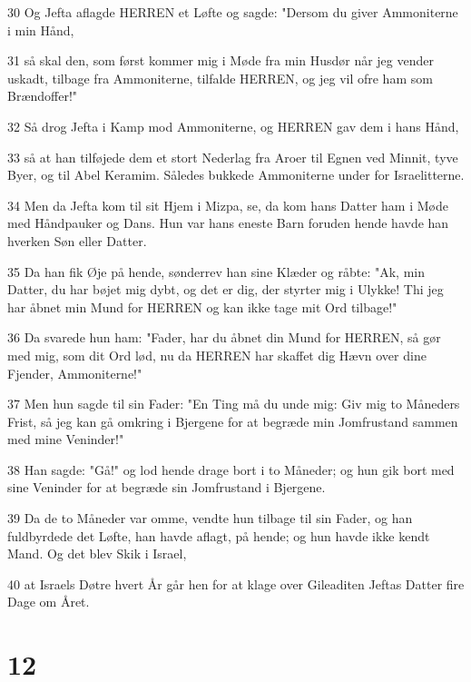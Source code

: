 \par 30 Og Jefta aflagde HERREN et Løfte og sagde: "Dersom du giver Ammoniterne i min Hånd,
\par 31 så skal den, som først kommer mig i Møde fra min Husdør når jeg vender uskadt, tilbage fra Ammoniterne, tilfalde HERREN, og jeg vil ofre ham som Brændoffer!"
\par 32 Så drog Jefta i Kamp mod Ammoniterne, og HERREN gav dem i hans Hånd,
\par 33 så at han tilføjede dem et stort Nederlag fra Aroer til Egnen ved Minnit, tyve Byer, og til Abel Keramim. Således bukkede Ammoniterne under for Israelitterne.
\par 34 Men da Jefta kom til sit Hjem i Mizpa, se, da kom hans Datter ham i Møde med Håndpauker og Dans. Hun var hans eneste Barn foruden hende havde han hverken Søn eller Datter.
\par 35 Da han fik Øje på hende, sønderrev han sine Klæder og råbte: "Ak, min Datter, du har bøjet mig dybt, og det er dig, der styrter mig i Ulykke! Thi jeg har åbnet min Mund for HERREN og kan ikke tage mit Ord tilbage!"
\par 36 Da svarede hun ham: "Fader, har du åbnet din Mund for HERREN, så gør med mig, som dit Ord lød, nu da HERREN har skaffet dig Hævn over dine Fjender, Ammoniterne!"
\par 37 Men hun sagde til sin Fader: "En Ting må du unde mig: Giv mig to Måneders Frist, så jeg kan gå omkring i Bjergene for at begræde min Jomfrustand sammen med mine Veninder!"
\par 38 Han sagde: "Gå!" og lod hende drage bort i to Måneder; og hun gik bort med sine Veninder for at begræde sin Jomfrustand i Bjergene.
\par 39 Da de to Måneder var omme, vendte hun tilbage til sin Fader, og han fuldbyrdede det Løfte, han havde aflagt, på hende; og hun havde ikke kendt Mand. Og det blev Skik i Israel,
\par 40 at Israels Døtre hvert År går hen for at klage over Gileaditen Jeftas Datter fire Dage om Året.

\chapter{12}

